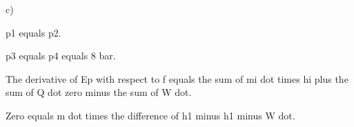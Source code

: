 c)

p1 equals p2.

p3 equals p4 equals 8 bar.

The derivative of Ep with respect to f equals the sum of mi dot times hi plus the sum of Q dot zero minus the sum of W dot.

Zero equals m dot times the difference of h1 minus h1 minus W dot.